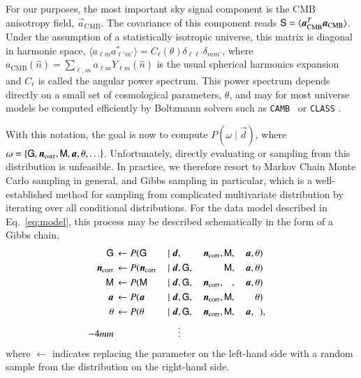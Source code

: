 \documentclass[twocolumn]{../common/aa}
\def\camb{\texttt{CAMB}}
\renewcommand{\d}[0]{\vec{d}}
\renewcommand{\G}[0]{\tens{G}}
\newcommand{\n}[0]{\vec{n}}
\renewcommand{\a}[0]{\vec{a}}
\newcommand{\M}[0]{\tens{M}}
\renewcommand{\S}[0]{\tens{S}}
\newcommand{\data}{\vec d}
\newcommand{\ncorr}{\vec n_\mathrm{corr}}
\begin{document}
For our purposes, the most important sky signal component is the CMB anisotropy field, $\a_{\mathrm{CMB}}$. The covariance of this component reads $\S = \langle \a_{\mathrm{CMB}}^T \a_{\mathrm{CMB}}\rangle$. Under the assumption of a statistically isotropic universe, this matrix is diagonal in harmonic space, $\langle a_{\ell m} a^*_{\ell' m'}\rangle = C_{\ell}(\theta) \delta_{\ell\ell'}\delta_{mm'}$, where $a_{\mathrm{CMB}}(\hat{n}) = \sum_{\ell,m} a_{\ell m} Y_{\ell m}(\hat{n})$ is the usual spherical harmonics expansion and $C_{\ell}$ is called the angular power spectrum. This power spectrum depends directly on a small set of cosmological parameters, $\theta$, and may for most universe models be computed efficiently by Boltzmann solvers such as \camb\ \citep{Lewis:1999bs} or \texttt{CLASS} \citep{lesgourgues:2011}.

With this notation, the goal is now to compute $P(\omega\mid\d)$, where $\omega = \{\G, \n_{\mathrm{corr}}, \M, \a, \theta, \ldots\}$. Unfortunately, directly evaluating or sampling from this distribution is unfeasible. In practice, we therefore resort to Markov Chain Monte Carlo sampling in general, and Gibbs sampling in particular, which is a well-established method for sampling from complicated multivariate distribution by iterating over all conditional distributions. For the data model described in Eq.~\eqref{eq:model}, this process may be described schematically in the form of a Gibbs chain, 
  \begin{alignat}{9}
    \label{eq:gain_samp_dist}\G &\,\leftarrow          P(\G&\,               \mid \data, &\,\phantom{\G,} &\,\ncorr,&\,\M, &\,\a, &\,\theta)\\
    \label{eq:ncorr_samp_dist} \ncorr &\,\leftarrow    P(\ncorr&\,        \mid \data, &\,\G, &\,\phantom{\ncorr,}  &\,\M, &\,\a, &\,\theta)\\
    \label{eq:beta_samp}\M &\,\leftarrow                     P(\M &\, \mid \data, &\,\G, &\,\ncorr, &\,\phantom{\M}, &\,\a, &\,\theta)\\
    \a &\,\leftarrow                                   P(\a&\,            \mid \data, &\,\G, &\,\ncorr, &\,\M, &\,\phantom{\a,} &\,\theta)\\
    \theta &\,\leftarrow                             P(\theta &\,         \mid \data, &\,\G, &\,\ncorr, &\,\M, &\,\a,&\,\phantom{\theta})\label{eq:param_samp},\\\vspace*{-4mm}
     &&\vdots                             & & & & & & \nonumber
    \end{alignat}
  where $\leftarrow$ indicates replacing the parameter on the left-hand side with a random sample from the distribution on the right-hand side.
\end{document}
